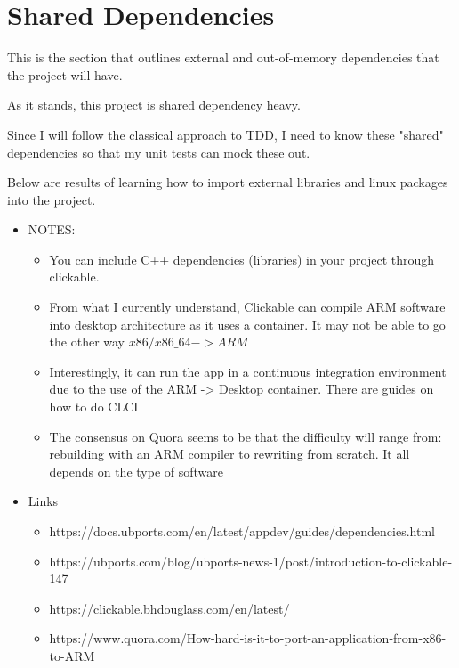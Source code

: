 \section{Shared Dependencies}

This is the section that outlines external and out-of-memory dependencies that the project will have.

 As it stands, this project is shared dependency heavy.

 Since I will follow the classical approach to TDD, I need to know these "shared" dependencies so that my unit tests can mock these out.


Below are results of learning how to import external libraries and linux packages into the project. 


\begin{itemize}
	\item NOTES:
	\begin{itemize}
		\item You can include C++ dependencies (libraries) in your project through clickable.
		\item From what I currently understand, Clickable can compile ARM software into desktop architecture as it uses a container. It may not be able to go the other way \(x86 / x86\_64 -> ARM\)
		\item Interestingly, it can run the app in a continuous integration environment due to the use of the ARM -> Desktop container. There are guides on how to do CLCI
		\item The consensus on Quora seems to be that the difficulty will range from: rebuilding with an ARM compiler to rewriting from scratch. It all depends on the type of software
	\end{itemize}
\end{itemize}



\begin{itemize}
	\item Links
	\begin{itemize}
		\item https://docs.ubports.com/en/latest/appdev/guides/dependencies.html
		\item https://ubports.com/blog/ubports-news-1/post/introduction-to-clickable-147
		\item https://clickable.bhdouglass.com/en/latest/
		\item https://www.quora.com/How-hard-is-it-to-port-an-application-from-x86-to-ARM
	\end{itemize}
\end{itemize}



